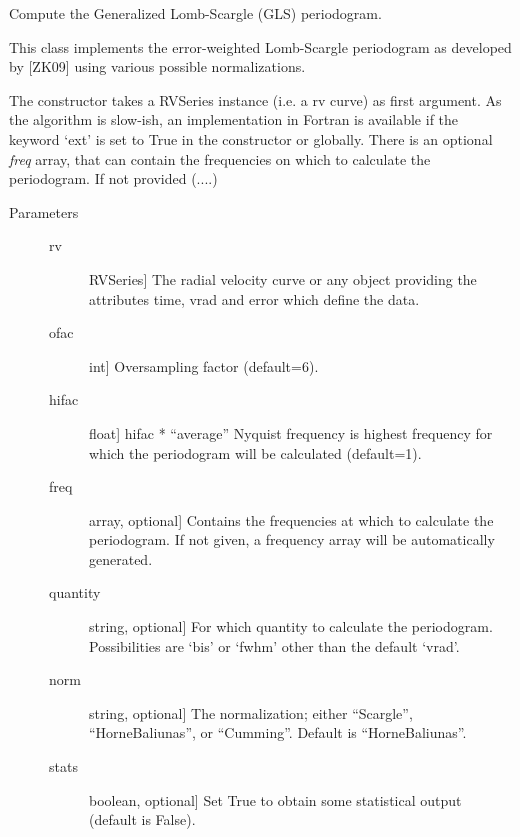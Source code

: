 \documentclass[letterpaper,10pt,english]{sphinxmanual}
\begin{document}
\begin{fulllineitems}
\label{api:OPEN.periodograms.gls}
Compute the Generalized Lomb-Scargle (GLS) periodogram.

This class implements the error-weighted Lomb-Scargle periodogram as
developed by {[}ZK09{]} using various possible normalizations.

The constructor takes a RVSeries instance (i.e. a rv curve) as 
first argument. As the algorithm is slow-ish, an implementation
in Fortran is available if the keyword `ext' is set to True in 
the constructor or globally. 
There is an optional \emph{freq} array, that can contain the 
frequencies on which to calculate the periodogram. If not provided
(....)
\begin{description}
\item[{Parameters}] \leavevmode\begin{description}
\item[{rv}] \leavevmode{[}RVSeries{]}
The radial velocity curve or any object providing the attributes
time, vrad and error which define the data.

\item[{ofac}] \leavevmode{[}int{]}
Oversampling factor (default=6).

\item[{hifac}] \leavevmode{[}float{]}
hifac * ``average'' Nyquist frequency is highest frequency for 
which the periodogram will be calculated (default=1).

\item[{freq}] \leavevmode{[}array, optional{]}
Contains the frequencies at which to calculate the periodogram.
If not given, a frequency array will be automatically generated.

\item[{quantity}] \leavevmode{[}string, optional{]}
For which quantity to calculate the periodogram. Possibilities are
`bis' or `fwhm' other than the default `vrad'.

\item[{norm}] \leavevmode{[}string, optional{]}
The normalization; either ``Scargle'', ``HorneBaliunas'', or 
``Cumming''. Default is ``HorneBaliunas''.

\item[{stats}] \leavevmode{[}boolean, optional{]}
Set True to obtain some statistical output (default is False).


\end{description}
\end{description}
\end{fulllineitems}
\end{document}
